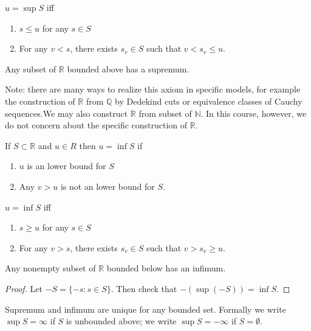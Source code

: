 \begin{proposition}
	$u = \operatorname{sup} S$ iff
	\begin{enumerate}
		\item $s\le u$ for any $s \in S$ 
		\item For any  $v<s$, there exists $s_v \in S$ such that  $v <s_v \le u$.
	\end{enumerate}
\end{proposition}

\begin{axiom}
	Any subset of $\mathbb{R}$ bounded above has a supremum.
\end{axiom}

Note: there are many ways to realize this axiom in specific models, for example the construction of $\mathbb{R}$ from $\mathbb{Q}$ by Dedekind cuts or equivalence classes of Cauchy sequences.We may also construct $\mathbb{R}$ from subset of $\mathbb{N}$. In this course, however, we do not concern about the specific construction of $\mathbb{R}$.

\begin{definition}[infimum]
	If  $S \subset  \mathbb{R}$ and $u \in  R$ then $u = \operatorname{inf} S$ if 
	\begin{enumerate}
		\item $u$ is an lower bound for $S$ 
		\item Any $v>u$ is not an lower bound for $S$.
	\end{enumerate}
\end{definition}

\begin{proposition}
	$u = \operatorname{inf} S$ iff
	\begin{enumerate}
		\item $s\ge u$ for any $s \in S$ 
		\item For any  $v>s$, there exists $s_v \in S$ such that  $v >s_v \ge u$.
	\end{enumerate}
\end{proposition}

\begin{theorem}
	Any nonempty subset of $\mathbb{R}$ bounded below has an infimum.
\end{theorem}
\begin{proof}
Let $-S = \{-s:s\in S\} $. Then check that $-\left( \operatorname{sup} \left( -S \right)  \right) =\operatorname{inf} S$.
\end{proof}

\begin{remark}
	Supremum and infimum are unique for any bounded set. Formally we write $\operatorname{sup} S = \infty $ if $S$ is unbounded above; we write $\operatorname{sup} S = -\infty  $ if $S = \emptyset $.
\end{remark}


